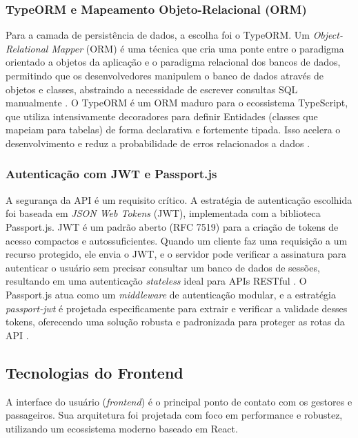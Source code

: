 \subsubsection{TypeORM e Mapeamento Objeto-Relacional (ORM)}
Para a camada de persistência de dados, a escolha foi o TypeORM. Um \textit{Object-Relational Mapper} (ORM) é uma técnica que cria uma ponte entre o paradigma orientado a objetos da aplicação e o paradigma relacional dos bancos de dados, permitindo que os desenvolvedores manipulem o banco de dados através de objetos e classes, abstraindo a necessidade de escrever consultas SQL manualmente \cite{logrocket2024typeorm}. O TypeORM é um ORM maduro para o ecossistema TypeScript, que utiliza intensivamente decoradores para definir Entidades (classes que mapeiam para tabelas) de forma declarativa e fortemente tipada. Isso acelera o desenvolvimento e reduz a probabilidade de erros relacionados a dados \cite{devto2024typeorm}.

\subsubsection{Autenticação com JWT e Passport.js}
A segurança da API é um requisito crítico. A estratégia de autenticação escolhida foi baseada em \textit{JSON Web Tokens} (JWT), implementada com a biblioteca Passport.js. JWT é um padrão aberto (RFC 7519) para a criação de tokens de acesso compactos e autossuficientes. Quando um cliente faz uma requisição a um recurso protegido, ele envia o JWT, e o servidor pode verificar a assinatura para autenticar o usuário sem precisar consultar um banco de dados de sessões, resultando em uma autenticação \textit{stateless} ideal para APIs RESTful \cite{soshace2024jwt}. O Passport.js atua como um \textit{middleware} de autenticação modular, e a estratégia \textit{passport-jwt} é projetada especificamente para extrair e verificar a validade desses tokens, oferecendo uma solução robusta e padronizada para proteger as rotas da API \cite{passportjs2025jwt}.

\subsection{Tecnologias do Frontend}

A interface do usuário (\textit{frontend}) é o principal ponto de contato com os gestores e passageiros. Sua arquitetura foi projetada com foco em performance e robustez, utilizando um ecossistema moderno baseado em React.


